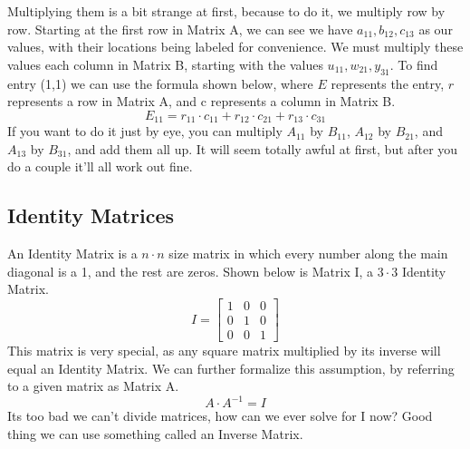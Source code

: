         Multiplying them is a bit strange at first, because to do it, we multiply row by row.
        Starting at the first row in Matrix A, we can see we have $a_{11},b_{12},c_{13}$ as our values, with their locations being labeled for convenience.
        We must multiply these values each column in Matrix B, starting with the values $u_{11},w_{21},y_{31}$.
        To find entry (1,1) we can use the formula shown below, where $E$ represents the entry, $r$ represents a row in Matrix A, and c represents a column in Matrix B.
        \begin{equation*}
            E_{11} = r_{11} \cdot c_{11}  +  r_{12} \cdot c_{21}  +   r_{13} \cdot c_{31}
        \end{equation*}
        If you want to do it just by eye, you can multiply $A_{11}$ by $B_{11}$, $A_{12}$ by $B_{21}$, and $A_{13}$ by $B_{31}$, and add them all up.
        It will seem totally awful at first, but after you do a couple it'll all work out fine.
        
    \subsection{Identity Matrices}
        An Identity Matrix is a $n\cdot n$ size matrix in which every number along the main diagonal is a 1, and the rest are zeros.
        Shown below is Matrix I, a $3\cdot 3$ Identity Matrix.
        \begin{equation*}
        I =
            \begin{bmatrix}
                1 & 0 & 0\\
                0 & 1 & 0\\
                0 & 0 & 1
            \end{bmatrix}
        \end{equation*}
        This matrix is very special, as any square matrix multiplied by its inverse will equal an Identity Matrix.
        We can further formalize this assumption, by referring to a given matrix as Matrix A.
        \begin{equation*}
            A\cdot A^{-1} = I
        \end{equation*}
        Its too bad we can't divide matrices, how can we ever solve for I now? Good thing we can use something called an Inverse Matrix.
        
